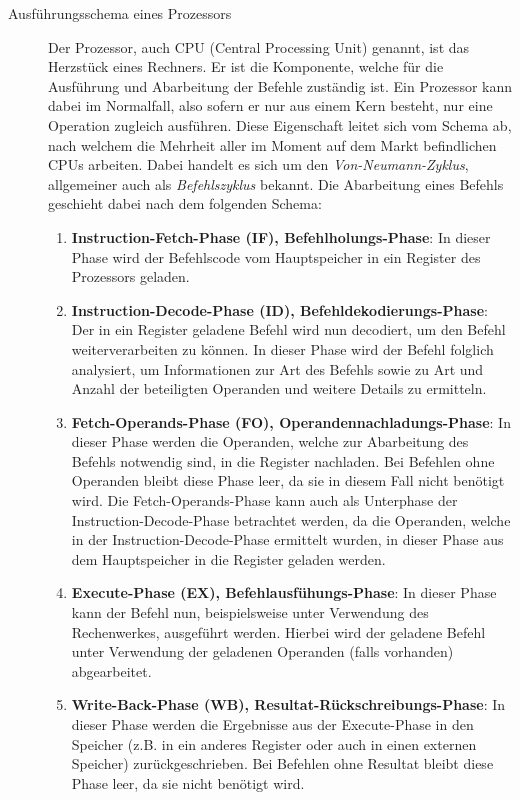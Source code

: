 				\begin{description}
			  		\item[Ausführungsschema eines Prozessors]
						Der Prozessor, auch CPU (Central Processing Unit) genannt, ist das Herzstück eines Rechners. Er ist die Komponente, welche für die Ausführung und Abarbeitung der Befehle zuständig ist. Ein Prozessor kann dabei im Normalfall, also sofern er nur aus einem Kern besteht, nur eine Operation zugleich ausführen. Diese Eigenschaft leitet sich vom Schema ab, nach welchem die Mehrheit aller im Moment auf dem Markt befindlichen CPUs arbeiten. Dabei handelt es sich um den \textit{Von-Neumann-Zyklus}, allgemeiner auch als \textit{Befehlszyklus} bekannt.
						Die Abarbeitung eines Befehls geschieht dabei nach dem folgenden Schema:
						
						\begin{enumerate}
							\item \textbf{Instruction-Fetch-Phase (IF), Befehlholungs-Phase}: In dieser Phase wird der Befehlscode vom Hauptspeicher in ein Register des Prozessors geladen.
							\item \textbf{Instruction-Decode-Phase (ID), Befehldekodierungs-Phase}: Der in ein Register geladene Befehl wird nun decodiert, um den Befehl weiterverarbeiten zu können. In dieser Phase wird der Befehl folglich analysiert, um Informationen zur Art des Befehls sowie zu Art und Anzahl der beteiligten Operanden und weitere Details zu ermitteln.
							\item \textbf{Fetch-Operands-Phase (FO), Operandennachladungs-Phase}: In dieser Phase werden die Operanden, welche zur Abarbeitung des Befehls notwendig sind, in die Register nachladen. Bei Befehlen ohne Operanden bleibt diese Phase leer, da sie in diesem Fall nicht benötigt wird. Die Fetch-Operands-Phase kann auch als Unterphase der Instruction-Decode-Phase betrachtet werden, da die Operanden, welche in der Instruction-Decode-Phase ermittelt wurden, in dieser Phase aus dem Hauptspeicher in die Register geladen werden.
							\item \textbf{Execute-Phase (EX), Befehlausfühungs-Phase}: In dieser Phase kann der Befehl nun, beispielsweise unter Verwendung des Rechenwerkes, ausgeführt werden. Hierbei wird der geladene Befehl unter Verwendung der geladenen Operanden (falls vorhanden) abgearbeitet.
							\item \textbf{Write-Back-Phase (WB), Resultat-Rückschreibungs-Phase}: In dieser Phase werden die Ergebnisse aus der Execute-Phase in den Speicher (z.B. in ein anderes Register oder auch in einen externen Speicher) zurückgeschrieben. Bei Befehlen ohne Resultat bleibt diese Phase leer, da sie nicht benötigt wird.
						\end{enumerate}
						

\end{description}
